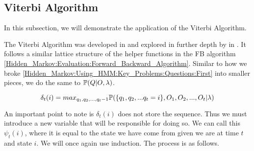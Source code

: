     \subsection{Viterbi Algorithm}
    \label{Hidden_Markov:Decoding:Vierbi_Algorithm}

    In this subsection, we will demonstrate the application of the Viterbi Algorithm.

    The Viterbi Algorithm was developed in \cite{Viterbi1967} and explored in further depth by in \cite{Forney1973}. It follows a similar lattice structure of the helper functions in the FB algorithm \ref{Hidden_Markov:Evaluation:Forward_Backward_Algorithm}. Similar to how we broke \ref{Hidden_Markov:Using_HMM:Key_Problems:Questions:First} into smaller pieces, we do the same to $\mathbb{P} (Q | O, \lambda)$.

    \begin{equation}
        \delta_t(i)  = max_{q_1,q_2,...,q_t-1} \mathbb{P} (\{q_1,q_2,...q_t=i\},{O_1,O_2,...,O_t}|\lambda) 
    \end{equation}

    An important point to note is $\delta_t(i)$ does not store the sequence. Thus we must introduce a new variable that will be responsible for doing so. We can call this $\psi_t(i)$, where it is equal to the state we have come from given we are at time $t$ and state $i$. We will once again use induction. The process is as follows.

